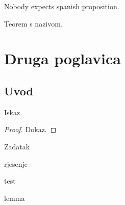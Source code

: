 \documentclass[a4paper,oneside,12pt]{memoir}
\begin{document}
\begin{proposition}
    Nobody expects spanish proposition.
\end{proposition}

\begin{theorem}
    Teorem s nazivom.
\end{theorem}

\chapter{Druga poglavica}

\section{Uvod}

\begin{theorem}
    Iskaz.
\end{theorem}

\begin{proof}
    Dokaz.
\end{proof}

\begin{exercise}
    Zadatak
\end{exercise}

\begin{solution}
    rjesenje
\end{solution}

\begin{corollary}
    test
\end{corollary}

\begin{lemma}
    lemma
\end{lemma}


\end{document}
